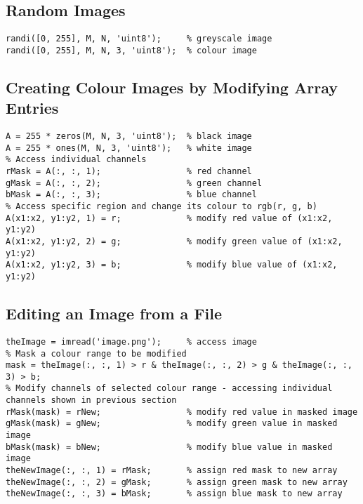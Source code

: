 \documentclass{article}
\begin{document}
\subsection*{Random Images}
\begin{lstlisting}
randi([0, 255], M, N, 'uint8');     % greyscale image
randi([0, 255], M, N, 3, 'uint8');  % colour image
\end{lstlisting}
\subsection*{Creating Colour Images by Modifying Array Entries}
\begin{lstlisting}
A = 255 * zeros(M, N, 3, 'uint8');  % black image
A = 255 * ones(M, N, 3, 'uint8');   % white image
% Access individual channels
rMask = A(:, :, 1);                 % red channel
gMask = A(:, :, 2);                 % green channel
bMask = A(:, :, 3);                 % blue channel
% Access specific region and change its colour to rgb(r, g, b)
A(x1:x2, y1:y2, 1) = r;             % modify red value of (x1:x2, y1:y2)
A(x1:x2, y1:y2, 2) = g;             % modify green value of (x1:x2, y1:y2)
A(x1:x2, y1:y2, 3) = b;             % modify blue value of (x1:x2, y1:y2)
\end{lstlisting}
\subsection*{Editing an Image from a File}
\begin{lstlisting}
theImage = imread('image.png');     % access image 
% Mask a colour range to be modified
mask = theImage(:, :, 1) > r & theImage(:, :, 2) > g & theImage(:, :, 3) > b;
% Modify channels of selected colour range - accessing individual channels shown in previous section
rMask(mask) = rNew;                 % modify red value in masked image
gMask(mask) = gNew;                 % modify green value in masked image
bMask(mask) = bNew;                 % modify blue value in masked image
theNewImage(:, :, 1) = rMask;       % assign red mask to new array 
theNewImage(:, :, 2) = gMask;       % assign green mask to new array
theNewImage(:, :, 3) = bMask;       % assign blue mask to new array
\end{lstlisting}
\end{document}
